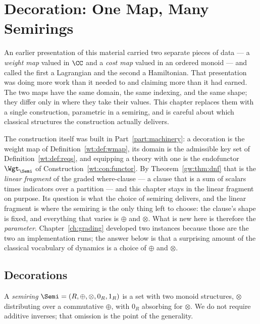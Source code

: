 \chapter{Decoration: One Map, Many Semirings}
\label{sec:weighted}

An earlier presentation of this material carried two separate pieces of
data --- a \emph{weight map} valued in $\CC$ and a \emph{cost map} valued
in an ordered monoid --- and called the first a Lagrangian and the second
a Hamiltonian.  That presentation was doing more work than it needed to
and claiming more than it had earned.  The two maps have the same domain,
the same indexing, and the same shape; they differ only in where they take
their values.  This chapter replaces them with a single construction,
parametric in a semiring, and is careful about which classical structures
the construction actually delivers.

The construction itself was built in Part~\ref{part:machinery}: a
decoration is the weight map of Definition~\ref{wt:def:wmap}, its domain
is the admissible key set of Definition~\ref{wt:def:reqs}, and equipping
a theory with one is the endofunctor $\Wgt_{\Semi}$ of
Construction~\ref{wt:con:functor}.  By Theorem~\ref{gw:thm:dnf} that is
the \emph{linear fragment} of the graded where-clause --- a clause that
is a sum of scalars times indicators over a partition --- and this
chapter stays in the linear fragment on purpose.  Its question is what
the choice of semiring delivers, and the linear fragment is where the
semiring is the only thing left to choose: the clause's shape is fixed,
and everything that varies is $\oplus$ and $\otimes$.  What is new here
is therefore the \emph{parameter}.  Chapter~\ref{ch:grading} developed
two instances because those are the two an implementation runs; the
answer below is that a surprising amount of the classical vocabulary of
dynamics is a choice of $\oplus$ and $\otimes$.

\section{Decorations}

\begin{definition}[Semiring]
A \emph{semiring} $\Semi = (R, \oplus, \otimes, 0_R, 1_R)$ is a set with
two monoid structures, $\otimes$ distributing over a commutative $\oplus$,
with $0_R$ absorbing for $\otimes$.  We do not require additive inverses;
that omission is the point of the generality.
\end{definition}

